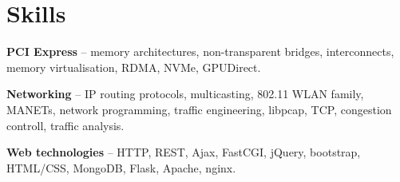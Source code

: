 \section{Skills}
\begin{small}
	\parbox[t][][t]{\linewidth}{
		\textbf{PCI Express} -- memory architectures, non-transparent
		bridges, interconnects, memory virtualisation, RDMA, NVMe,
		GPUDirect.
		\smallbreak
	}
	\parbox[t][][t]{\linewidth}{
		\textbf{Networking} -- IP routing protocols,
		multicasting, 802.11 WLAN family, MANETs, network programming, 
		traffic engineering, libpcap, TCP, congestion controll, traffic
		analysis.
		\smallbreak
	}
	\parbox[t][][t]{\linewidth}{
		\textbf{Web technologies} -- HTTP, REST, Ajax, FastCGI, jQuery,
		bootstrap, HTML/CSS, MongoDB, Flask, Apache, nginx.
		\bigbreak
	}
\end{small}


